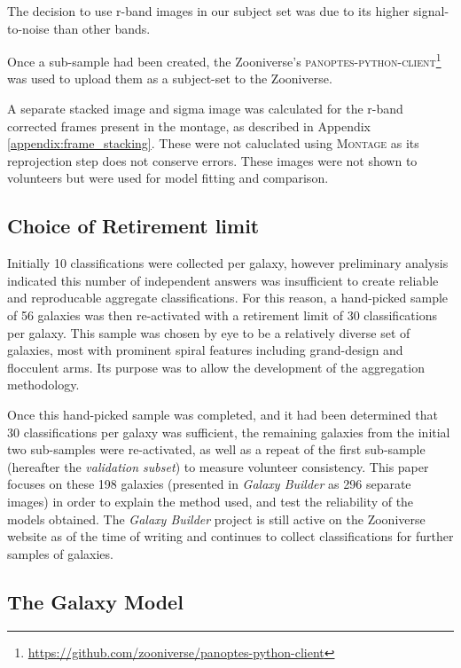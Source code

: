 \documentclass[../main.tex]{subfiles}
\begin{document}
The decision to use r-band images in our subject set was due to its higher signal-to-noise than other bands.

Once a sub-sample had been created, the Zooniverse's \textsc{panoptes-python-client}\footnote{\url{https://github.com/zooniverse/panoptes-python-client}} was used to upload them as a subject-set to the Zooniverse.

A separate stacked image and sigma image was calculated for the r-band corrected frames present in the montage, as described in Appendix \ref{appendix:frame_stacking}. These were not caluclated using \textsc{Montage} as its reprojection step does not conserve errors. These images were not shown to volunteers but were used for model fitting and comparison.


\subsection{Choice of Retirement limit}
\label{sec:retirement-limit}

Initially 10 classifications were collected per galaxy, however preliminary analysis indicated this number of independent answers was insufficient to create reliable and reproducable aggregate classifications. For this reason, a hand-picked sample of 56 galaxies was then re-activated with a retirement limit of 30 classifications per galaxy. This sample was chosen by eye to be a relatively diverse set of galaxies, most with prominent spiral features including grand-design and flocculent arms. Its purpose was to allow the development of the aggregation methodology.

Once this hand-picked sample was completed, and it had been determined that 30 classifications per galaxy was sufficient, the remaining galaxies from the initial two sub-samples were re-activated, as well as a repeat of the first sub-sample (hereafter the \textit{validation subset}) to measure volunteer consistency. This paper focuses on these 198 galaxies (presented in \textit{Galaxy Builder} as 296 separate images) in order to explain the method used, and test the reliability of the models obtained. The \textit{Galaxy Builder} project is still active on the Zooniverse website as of the time of writing and continues to collect classifications for further samples of galaxies.


\subsection{The Galaxy Model}
\label{section:galaxy-model}
\end{document}

